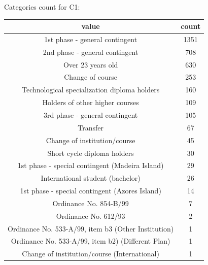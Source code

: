 \documentclass{article}
\begin{document}
\begin{description}
\begin{itemize}
				Categories count for C1:
				\begin{center}
					\begin{tabular}{|c|c|}
						\hline
						value & count \\
						\hline
						1st phase - general contingent                        & 1351 \\
						2nd phase - general contingent                         &708 \\
						Over 23 years old                                      &630 \\
						Change of course                                       &253 \\
						Technological specialization diploma holders           & 160 \\
						Holders of other higher courses                        & 109 \\
						3rd phase - general contingent                         & 105 \\
						Transfer                                               &  67 \\
						Change of institution/course                           &  45 \\
						Short cycle diploma holders                            &  30 \\
						1st phase - special contingent (Madeira Island)        &  29 \\
						International student (bachelor)                       &  26 \\
						1st phase - special contingent (Azores Island)         &  14 \\
						Ordinance No. 854-B/99                                 &   7 \\
						Ordinance No. 612/93                                   &   2 \\
						Ordinance No. 533-A/99, item b3 (Other Institution)    &   1 \\
						Ordinance No. 533-A/99, item b2) (Different Plan)      &   1 \\
						Change of institution/course (International)           &   1 \\
						\hline
					\end{tabular}
				\end{center}


\end{itemize}
\end{description}
\end{document}
